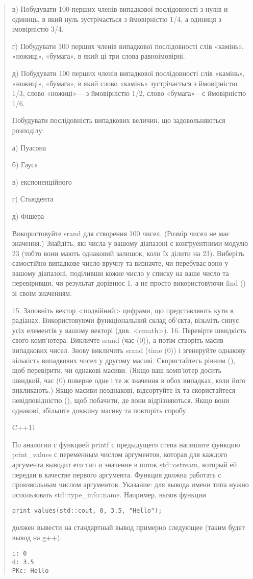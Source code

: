 \documentclass[]{article}
\begin{document}
\begin{quote}
в) Побудувати 100 перших членів випадкової послідовності з нулів и
одиниць, в який нуль зустрічається з ймовірністю 1/4, а одиниця з
імовірністю 3/4,

г) Побудувати 100 перших членів випадкової послідовності слів «камінь»,
«ножиці», «бумага», в який ці три слова равноімовірні.

д) Побудувати 100 перших членів випадкової послідовності слів «камінь»,
«ножиці», «бумага», в який слово «камінь» зустрічається з ймовірністю
1/3, слово «ножиці»--- з ймовірністю 1/2, слово «бумага»---с ймовірністю
1/6.

Побудувати послідовність випадкових величин, що задовольняються
розподілу:

а) Пуасона

б) Гауса

в) експоненційного

г) Стьюдента

д) Фішера

Використовуйте srand для створення 100 чисел. (Розмір чисел не має
значення.) Знайдіть, які числа у вашому діапазоні є конгруентними модулю
23 (тобто вони мають однаковий залишок, коли їх ділити на 23). Виберіть
самостійно випадкове число вручну та визначте, чи перебуває воно у
вашому діапазоні, поділивши кожне число у списку на ваше число та
перевіривши, чи результат дорівнює 1, а не просто використовуючи find ()
зі своїм значенням. 

15. Заповніть вектор
\textless{}подвійний\textgreater{} цифрами, що представляють кути в
радіанах. Використовуючи функціональний склад об'єкта, візьміть синус
усіх елементів у вашому векторі (див. \textless{}cmath\textgreater{}).
16. Перевірте швидкість свого комп'ютера. Викличте srand (час (0)), а
потім створіть масив випадкових чисел. Знову викличить srand (time (0))
і згенеруйте однакову кількість випадкових чисел у другому масиві.
Скористайтесь рівним (), щоб перевірити, чи однакові масиви. (Якщо ваш
комп'ютер досить швидкий, час (0) поверне одне і те ж значення в обох
випадках, коли його викликають.) Якщо масиви неоднакові, відсортуйте їх
та скористайтеся невідповідністю (), щоб побачити, де вони
відрізняються. Якщо вони однакові, збільште довжину масиву та повторіть
спробу.


C++11



По аналогии с функцией printf с предыдущего степа напишите функцию print\_values с переменным числом аргументов, которая для каждого аргумента выводит его тип и значение в поток std::ostream, который ей передан в качестве первого аргумента. Функция должна работать с произвольным числом аргументов.
Указание: для вывода имени типа нужно использовать std::type\_info::name.
Например, вызов функции
\begin{verbatim}
print_values(std::cout, 0, 3.5, "Hello");
\end{verbatim}
должен вывести на стандартный вывод примерно следующее (таким будет вывод на g++).
\begin{verbatim}
i: 0
d: 3.5
PKc: Hello
\end{verbatim}


\end{quote}
\end{document}
